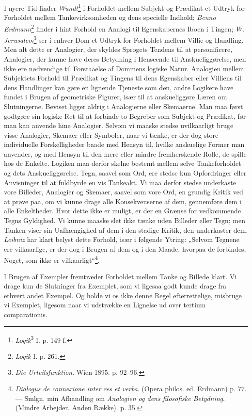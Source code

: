 \documentclass[12pt,a4paper]{book}
\newcommand{\opage}[1]{\marginnote{\footnotesize\textit{[#1]}}}
\begin{document}
I nyere Tid finder \emph{Wundt}\footnote{\emph{Logik}\textsuperscript{3}
I. p. 149 f.} i Forholdet mellem Subjekt og Prædikat et Udtryk for
Forholdet mellem Tankevirksomheden og dens specielle Indhold;
\emph{Benno Erdmann}\footnote{\emph{Logik} I. p. 261.} finder i hint
Forhold en Analogi til Egenskabernes Iboen i Tingen; \emph{W.
Jerusalem}\footnote{\emph{Die Urteilsfunktion}. Wien 1895. p. 92--96.}
ser i enhver Dom et Udtryk for Forholdet mellem Villie og Handling. Men
alt dette er Analogier, der skyldes Sprogets Tendens til at
personificere, Analogier, der kunne have deres Betydning i Henseende til
Anskueliggørelse, men ikke ere nødvendige til Forstaaelse af Dommens
logiske Natur. Analogien mellem Subjektets Forhold til Prædikat og
Tingens til dens Egenskaber eller Villiens til dens Handlinger kan gøre
en lignende Tjeneste som den, andre Logikere have fundet i Brugen af
geometriske Figurer, især til at anskueliggøre Læren om Slutningerne.
Beviset ligger aldrig i Analogierne eller Skemaerne. Man maa først
godtgøre sin logiske Ret til at forbinde to Begreber som Subjekt og
Prædikat, før man kan anvende hine Analogier. Selvom vi maaske stedse
uvilkaarligt bruge visse Analogier, Skemaer eller Symboler, naar vi
tænke, er der dog store individuelle Forskelligheder baade med Hensyn
til, hvilke anskuelige Former man anvender, og med Hensyn til den mere
eller mindre fremherskende Rolle, de spille hos de Enkelte. Logiken maa
derfor skelne bestemt \opage{98} mellem selve Tankeforholdet og dets
Anskueliggørelse. Tegn, saavel som Ord, ere stedse kun Opfordringer
eller Anvisninger til at fuldbyrde en vis Tankeakt. Vi maa derfor stedse
underkaste vore Billeder, Analogier og Skemaer, saavel som vore Ord, en
grundig Kritik ved at prøve paa, om vi kunne drage alle Konsekvenserne
af dem, gennemføre dem i alle Enkeltheder. Hvor dette ikke er muligt, er
der en Grænse for vedkommende Tegns Gyldighed. Vi kunne maaske slet ikke
tænke uden Billeder eller Tegn; men Tanken viser sin Uafhængighed af dem
i den stadige Kritik, den underkaster dem. \emph{Leibniz} har klart
belyst dette Forhold, især i følgende Ytring: „Selvom Tegnene ere
vilkaarlige, er der dog i Brugen af dem og i den Maade, hvorpaa de
forbindes, Noget, som ikke er vilkaarligt“\footnote{\emph{Dialogus de
connexione inter res et verba}. (Opera philos. ed. Erdmann) p. 77. ---
Smlgn. min Afhandling om \emph{Analogien og dens filosofiske Betydning}.
(Mindre Arbejder. Anden Række). p. 35.}.

I Brugen af Exempler fremtræder Forholdet mellem Tanke og Billede klart.
Vi drage kun de Slutninger fra Exemplet, som vi ligesaa godt kunde drage
fra ethvert andet Exempel. Og holde vi os ikke denne Regel
efterrettelige, misbruge vi Exemplet, ligesom naar vi udstrække en
Lignelse ud over tertium comparationis.
\end{document}
